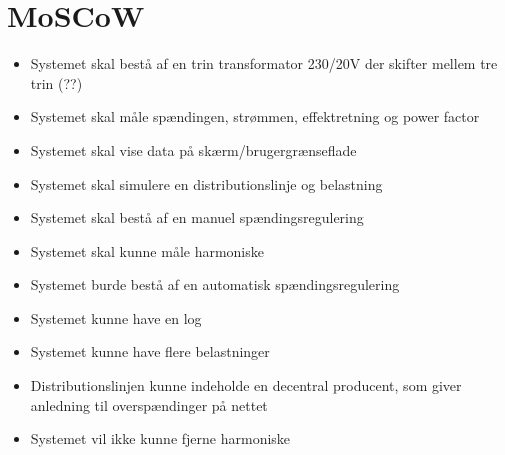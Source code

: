 
\section{MoSCoW}

\begin{itemize}
\item{Systemet skal bestå af en trin transformator 230/20V der skifter mellem tre trin (??)}
\item{Systemet skal måle spændingen, strømmen, effektretning og power factor}
\item{Systemet skal vise data på skærm/brugergrænseflade}
\item{Systemet skal simulere en distributionslinje og belastning}
\item{Systemet skal bestå af en manuel spændingsregulering}
\item{Systemet skal kunne måle harmoniske}
\item{Systemet burde bestå af en automatisk spændingsregulering}
\item{Systemet kunne have en log}
\item{Systemet kunne have flere belastninger}
\item{Distributionslinjen kunne indeholde en decentral producent, som giver anledning til overspændinger på nettet}
\item{Systemet vil ikke kunne fjerne harmoniske} 
\end{itemize}

